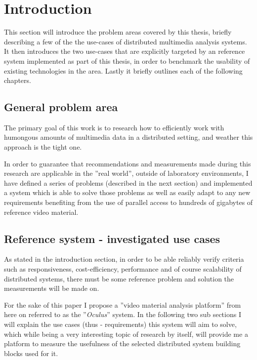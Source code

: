\chapter{Introduction}

This section will introduce the problem areas covered by this thesis, briefly describing a few of the the use-cases of distributed multimedia analysis systems. It then introduces the two use-cases that are explicitly targeted by an reference system implemented as part of this thesis, in order to benchmark the usability of existing technologies in the area. Lastly it briefly outlines each of the following chapters.


\section{General problem area}

The primary goal of this work is to research how to efficiently work with humongous amounts of multimedia data in a distributed setting, and weather this approach is the tight one.

In order to guarantee that recommendations and measurements made during this research are applicable in the ''real world'', outside of laboratory environments, I have defined a series of problems (described in the next section) and implemented a system which is able to solve those problems as well as easily adapt to any new requirements benefiting from the use of parallel access to hundreds of gigabytes of reference video material.

\section{Reference system - investigated use cases}

As stated in the introduction section, in order to be able reliably verify criteria such as responsiveness, cost-efficiency, performance and of course scalability of distributed systems, there must be some reference problem and solution the measurements will be made on. 

For the sake of this paper I propose a ''video material analysis platform'' from here on referred to as the ''\textit{Oculus}'' system.
In the following two sub sections I will explain the use cases (thus - requirements) this system will aim to solve, which while being a very interesting 
topic of research by itself, will provide me a platform to measure the usefulness of the selected distributed system building blocks used for it. 

